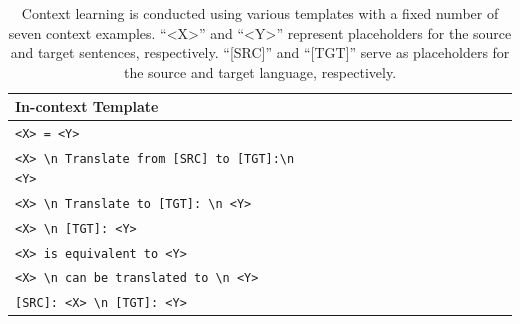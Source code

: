 \documentclass[acmsmall]{acmart}
\begin{document}
\begin{table}
    \centering
    \caption{Context learning is conducted using various templates with a fixed number of seven context examples. ``<X>'' and ``<Y>'' represent placeholders for the source and target sentences, respectively. ``[SRC]'' and ``[TGT]'' serve as placeholders for the source and target language, respectively.}
	\label{tab:B} 
    \begin{tabular}{>{\centering\arraybackslash}p{0.6\linewidth}>{\centering\arraybackslash}p{0.7\linewidth}}
        \toprule
        In-context Template  \\
        \midrule
        \texttt{<X> = <Y>} \\
        \texttt{<X> \textbackslash{}n Translate from [SRC] to [TGT]:\textbackslash{}n <Y>} \\
        \texttt{<X> \textbackslash{}n Translate to [TGT]: \textbackslash{}n <Y>}  \\
        \texttt{<X> \textbackslash{}n [TGT]: <Y>} \\
        \texttt{<X> is equivalent to <Y>}  \\
        \texttt{<X> \textbackslash{}n can be translated to \textbackslash{}n <Y>}  \\
        \texttt{[SRC]: <X> \textbackslash{}n [TGT]: <Y>}  \\
        \bottomrule
    \end{tabular}
\end{table}


%       
\end{document}
